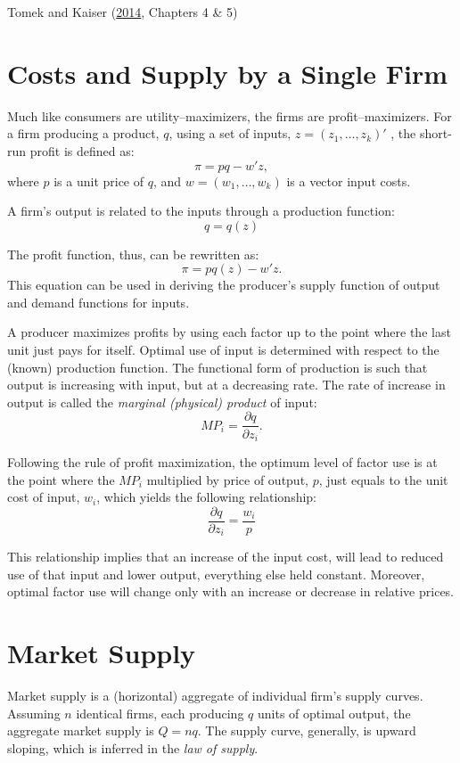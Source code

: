 \documentclass[
]{book}
\begin{document}
Tomek and Kaiser (\protect\hyperlink{ref-tomek2014}{2014}, Chapters 4 \& 5)

\hypertarget{costs-and-supply-by-a-single-firm}{%
\section{Costs and Supply by a Single Firm}\label{costs-and-supply-by-a-single-firm}}

Much like consumers are utility--maximizers, the firms are profit--maximizers. For a firm producing a product, \(q\), using a set of inputs, \(z=(z_1,\ldots,z_k)'\) , the short-run profit is defined as: \[\pi = pq-w'z,\] where \(p\) is a unit price of \(q\), and \(w=(w_1,\ldots,w_k)\) is a vector input costs.

A firm's output is related to the inputs through a production function: \[q = q(z)\]

The profit function, thus, can be rewritten as: \[\pi = pq(z)-w'z.\] This equation can be used in deriving the producer's supply function of output and demand functions for inputs.

A producer maximizes profits by using each factor up to the point where the last unit just pays for itself. Optimal use of input is determined with respect to the (known) production function. The functional form of production is such that output is increasing with input, but at a decreasing rate. The rate of increase in output is called the \emph{marginal (physical) product} of input: \[MP_i=\frac{\partial q}{\partial z_i}.\]

Following the rule of profit maximization, the optimum level of factor use is at the point where the \(MP_i\) multiplied by price of output, \(p\), just equals to the unit cost of input, \(w_i\), which yields the following relationship:\[\frac{\partial q}{\partial z_i} = \frac{w_i}{p}\]

This relationship implies that an increase of the input cost, will lead to reduced use of that input and lower output, everything else held constant. Moreover, optimal factor use will change only with an increase or decrease in relative prices.

\hypertarget{market-supply}{%
\section{Market Supply}\label{market-supply}}

Market supply is a (horizontal) aggregate of individual firm's supply curves. Assuming \(n\) identical firms, each producing \(q\) units of optimal output, the aggregate market supply is \(Q = nq\). The supply curve, generally, is upward sloping, which is inferred in the \emph{law of supply}.
\end{document}
